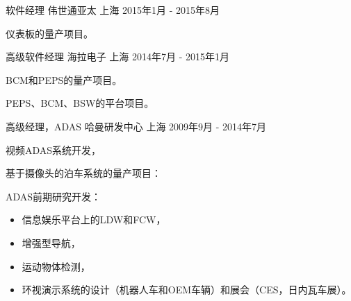 \documentclass[../cv_cn.tex]{subfiles}
\begin{document}
\begin{cventries}
	\cventry
	{软件经理} %
	{伟世通亚太} %
	{上海} %
	{2015年1月 - 2015年8月} %
	{
		\begin{cvitems}
			\item 仪表板的量产项目。
		\end{cvitems}
	}

	\cventry
	{高级软件经理} %
	{海拉电子} %
	{上海} %
	{2014年7月 - 2015年1月} %
	{
		\begin{cvitems}
			\item BCM和PEPS的量产项目。
			\item PEPS、BCM、BSW的平台项目。
		\end{cvitems}
	}

	\cventry
	{高级经理，ADAS} %
	{哈曼研发中心} %
	{上海} %
	{2009年9月 - 2014年7月} %
	{
		\begin{cvitems}
			\item 视频ADAS系统开发，
			\item 基于摄像头的泊车系统的量产项目：
			\item ADAS前期研究开发：
			\begin{itemize}
				\item 信息娱乐平台上的LDW和FCW，
				\item 增强型导航，
				\item 运动物体检测，
				\item 环视演示系统的设计（机器人车和OEM车辆）和展会（CES，日内瓦车展）。
			\end{itemize}
		\end{cvitems}
	}
\end{cventries}
\end{document}
